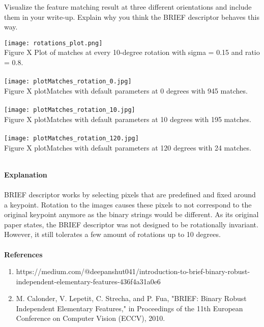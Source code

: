 \documentclass[12pt,letterpaper, onecolumn]{exam}
\begin{document}
\begin{questions}
    Visualize the feature matching result at three different orientations and include them in your write-up. Explain why you think the BRIEF descriptor behaves this way.

    \begin{solution}
        \begin{center}
            \centering
            \texttt{[image: rotations\_plot.png]}\\
            Figure X Plot of matches at every 10-degree rotation with sigma = 0.15 and ratio = 0.8.\\~\\
            \texttt{[image: plotMatches\_rotation\_0.jpg]}\\
            Figure X plotMatches with default parameters at 0 degrees with 945 matches.\\~\\
            \centering
            \texttt{[image: plotMatches\_rotation\_10.jpg]}\\
            Figure X plotMatches with default parameters at 10 degrees with 195 matches.\\~\\
            \centering
            \texttt{[image: plotMatches\_rotation\_120.jpg]}\\
            Figure X plotMatches with default parameters at 120 degrees with 24 matches.\\~\\
        \end{center}
        \textbf{Explanation} \\~\\
        BRIEF descriptor works by selecting pixels that are predefined and fixed around a keypoint. Rotation to the images causes these pixels to not correspond to the original keypoint anymore as the binary strings would be different. As its original paper states, the BRIEF descriptor was not designed to be rotationally invariant. However, it still tolerates a few amount of rotations up to 10 degrees. \\~\\
        \textbf{References}
        \begin{enumerate}
            \item https://medium.com/@deepanshut041/introduction-to-brief-binary-robust-independent-elementary-features-436f4a31a0e6
            \item M. Calonder, V. Lepetit, C. Strecha, and P. Fua, "BRIEF: Binary Robust Independent Elementary Features," in Proceedings of the 11th European Conference on Computer Vision (ECCV), 2010.
        \end{enumerate}
    \end{solution}
    


\end{questions}
\end{document}
